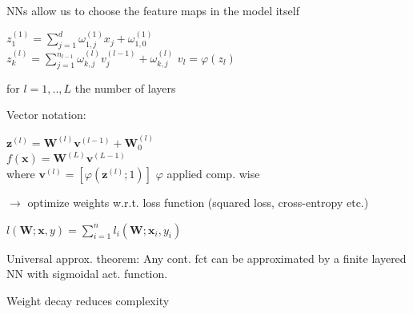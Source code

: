 NNs allow us to choose the feature maps in the model itself

\begin{center}
\end{center}

\begin{center}
    $z_1^{(1)} = \sum_{j=1}^d\omega_{1,j}^{(1)}x_j + \omega_{1,0}^{(1)}$\\
    $z_k^{(l)} = \sum_{j=1}^{n_{l-1}}\omega_{k,j}^{(l)}v_{j}^{(l-1)} + \omega_{k,j}^{(l)}$ \hspace{0.2cm} $v_l = \varphi(z_l)$
\end{center}
for $l = 1,..,L$ the number of layers

Vector notation:
\begin{center}
    $\boldsymbol{z}^{(l)} = \boldsymbol{W}^{(l)}\boldsymbol{v}^{(l-1)} + \boldsymbol{W}_0^{(l)}$\\
    $f(\boldsymbol{x}) = \boldsymbol{W}^{(L)}\boldsymbol{v}^{(L-1)}$\\
    where $\boldsymbol{v}^{(l)} = \left[\varphi(\boldsymbol{z}^{(l)};1)\right]$ $\varphi$ applied comp. wise
\end{center}

$\rightarrow$ optimize weights w.r.t. loss function (squared loss, cross-entropy etc.)

\begin{center}
    $l(\boldsymbol{W};\boldsymbol{x},y)= \sum_{i=1}^nl_i(\boldsymbol{W};\boldsymbol{x}_i,y_i)$
\end{center}
Universal approx. theorem: Any cont. fct can be approximated by a finite layered NN with sigmoidal act. function.

Weight decay reduces complexity





